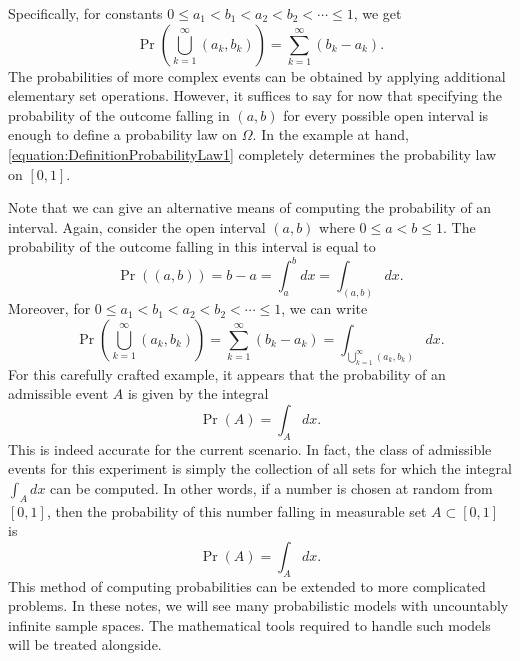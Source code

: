 Specifically, for constants $0 \leq a_1 < b_1 < a_2 < b_2 < \cdots \leq 1$, we get
\begin{equation*}
\Pr \left( \bigcup_{k=1}^{\infty} (a_k,b_k) \right)
= \sum_{k=1}^{\infty} \left( b_k - a_k \right) .
\end{equation*}
The probabilities of more complex events can be obtained by applying additional elementary set operations.
However, it suffices to say for now that specifying the probability of the outcome falling in $(a,b)$ for every possible open interval is enough to define a probability law on $\Omega$.
In the example at hand, \eqref{equation:DefinitionProbabilityLaw1} completely determines the probability law on $[0,1]$.

Note that we can give an alternative means of computing the probability of an interval.
Again, consider the open interval $(a, b)$ where $0 \leq a < b \leq 1$.
The probability of the outcome falling in this  interval is equal to
\begin{equation*}
\Pr ( (a, b) ) = b - a = \int_a^b dx = \int_{(a,b)} dx .
\end{equation*}
Moreover, for $0 \leq a_1 < b_1 < a_2 < b_2 < \cdots \leq 1$, we can write
\begin{equation*}
\Pr \left( \bigcup_{k=1}^{\infty} (a_k,b_k) \right)
= \sum_{k=1}^{\infty} \left( b_k - a_k \right)
= \int_{\bigcup_{k=1}^{\infty} (a_k,b_k)} dx .
\end{equation*}
For this carefully crafted example, it appears that the probability of an admissible event $A$ is given by the integral
\begin{equation*}
\Pr (A) = \int_{A} dx .
\end{equation*}
This is indeed accurate for the current scenario.
In fact, the class of admissible events for this experiment is simply the collection of all sets for which the integral $\int_A dx$ can be computed.
In other words, if a number is chosen at random from $[0,1]$, then the probability of this number falling in measurable set $A \subset [0,1]$ is
\begin{equation*}
\Pr (A) = \int_{A} dx .
\end{equation*}
This method of computing probabilities can be extended to more complicated problems.
In these notes, we will see many probabilistic models with uncountably infinite sample spaces.
The mathematical tools required to handle such models will be treated alongside.

